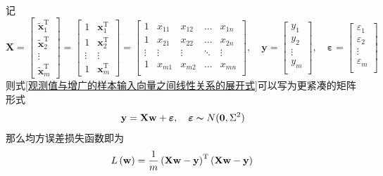 \documentclass[withoutpreface,bwprint]{NoteBook}
\begin{document}
记
$$
\mathbf{X}=\begin{bmatrix} \tilde{\mathbf{x}}_1^\mathrm{T}  \\  \tilde{\mathbf{x}}_2^\mathrm{T}  \\ \vdots \\\tilde{\mathbf{x}}_m^\mathrm{T}  \end{bmatrix} 
          =\begin{bmatrix} 1 & {\mathbf{x}}_1^\mathrm{T}  \\ 1 & {\mathbf{x}}_2^\mathrm{T}  \\ \vdots & \vdots \\ 1 & {\mathbf{x}}_m^\mathrm{T}  \end{bmatrix} 
          =\begin{bmatrix}
            1 & x_{11} & x_{12} & \dots & x_{1n} \\
            1 & x_{21} & x_{22} & \dots & x_{2n} \\
            \vdots & \vdots & \vdots & \ddots & \vdots \\
            1 & x_{m1} & x_{m2} & \dots & x_{mn} \\            
          \end{bmatrix}
,\quad
\mathbf{y} = 
\begin{bmatrix}
    y_1 \\
    y_2 \\
    \vdots \\
    y_m \\
\end{bmatrix}
,\quad
\bm{\varepsilon}=
\begin{bmatrix}
    \varepsilon _1 \\
    \varepsilon _2 \\
    \vdots \\
    \varepsilon _m \\
\end{bmatrix}
$$
则式\cref{观测值与增广的样本输入向量之间线性关系的展开式}可以写为更紧凑的矩阵形式
\begin{equation}
    \label{观测值与增广的样本输入向量之间线性关系的矩阵形式}
    \mathbf{y} = \mathbf{X} \mathbf{w} + \bm{\varepsilon},\quad \bm{\varepsilon} \thicksim N(\mathbf{0},\Sigma ^2) 
\end{equation}
那么均方误差损失函数即为
\begin{equation}
    \label{eq:损失函数矩阵形式}
    L\left ( \mathbf{w} \right ) = \frac{1}{m} \left (\mathbf{X} \mathbf{w} -\mathbf{y} \right )^\mathrm{T} \left (\mathbf{X} \mathbf{w} - \mathbf{y} \right ) \\
\end{equation}
\end{document}
